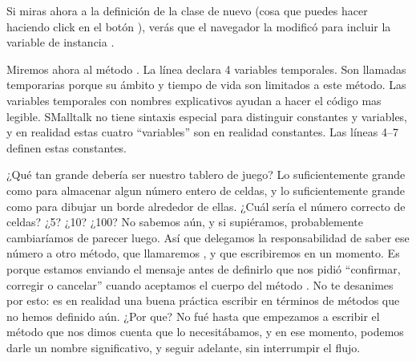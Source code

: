 \documentclass[a4paper,10pt,twoside]{book}
\begin{document}
Si miras ahora a la definici\'on de la clase de nuevo (cosa que puedes hacer haciendo click en el bot\'on ), ver\'as que el navegador la modific\'o para incluir la variable de instancia .

Miremos ahora al m\'etodo .
La l\'inea  declara 4 variables temporales. Son llamadas temporarias porque su \'ambito y tiempo de vida son limitados a este m\'etodo. Las variables temporales con nombres explicativos ayudan a hacer el c\'odigo mas legible. SMalltalk no tiene sintaxis especial para distinguir constantes y variables, y en realidad estas cuatro ``variables'' son en realidad constantes.
Las l\'ineas 4--7 definen estas constantes.

¿Qu\'e tan grande deber\'ia ser nuestro tablero de juego? Lo suficientemente grande como para almacenar algun n\'umero entero de celdas, y lo suficientemente grande como para dibujar un borde alrededor de ellas.
¿Cu\'al ser\'ia el n\'umero correcto de celdas? ¿5? ¿10? ¿100? No sabemos a\'un, y si supi\'eramos, probablemente cambiar\'iamos de parecer luego. As\'i que delegamos la responsabilidad de saber ese n\'umero a otro m\'etodo, que llamaremos , y que escribiremos en un momento.
Es porque estamos enviando el mensaje  antes de definirlo que \pharo nos pidi\'o ``confirmar, corregir o cancelar'' cuando aceptamos el cuerpo del m\'etodo .
No te desanimes por esto: es en realidad una buena pr\'actica escribir en t\'erminos de m\'etodos que no hemos definido a\'un.
¿Por que? No fu\'e hasta que empezamos a escribir el m\'etodo  que nos dimos cuenta que lo necesit\'abamos, y en ese momento, podemos darle un nombre significativo, y seguir adelante, sin interrumpir el flujo.
 
\end{document}
